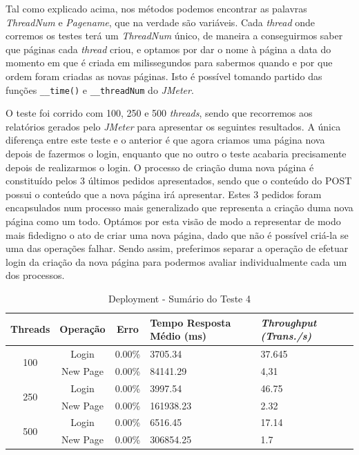 Tal como explicado acima, nos métodos podemos encontrar as palavras \textit{ThreadNum} e \textit{Pagename}, que na verdade são variáveis. Cada \textit{thread} onde corremos os testes terá um \textit{ThreadNum} único, de maneira a conseguirmos saber que páginas cada \textit{thread} criou, e optamos por dar o nome à página a data do momento em que é criada em milissegundos para sabermos quando e por que ordem foram criadas as novas páginas. Isto é possível tomando partido das funções \texttt{\_\_time()} e \texttt{\_\_threadNum} do \textit{JMeter}.

O teste foi corrido com 100, 250 e 500 \textit{threads}, sendo que recorremos aos relatórios gerados pelo \textit{JMeter} para apresentar os seguintes resultados. A única diferença entre este teste e o anterior é que agora criamos uma página nova depois de fazermos o login, enquanto que no outro o teste acabaria precisamente depois de realizarmos o login. O processo de criação duma nova página é constituído pelos 3 últimos pedidos apresentados, sendo que o conteúdo do POST possui o conteúdo que a nova página irá apresentar. Estes 3 pedidos foram encapsulados num processo mais generalizado que representa a criação duma nova página como um todo. Optámos por esta visão de modo a representar de modo mais fidedigno o ato de criar uma nova página, dado que não é possível criá-la se uma das operações falhar. Sendo assim, preferimos separar a operação de efetuar login da criação da nova página para podermos avaliar individualmente cada um dos processos. 

\begin{table}[H]
\centering
\begin{tabular}{|c|c|c|p{3.5cm}|p{3cm}|}
\hline
Threads              & Operação & Erro    & Tempo Resposta Médio (ms) & \textit{Throughput (Trans./s)} \\ \hline
\multirow{2}{*}{100} & Login    & 0.00\%  & 3705.34                   & 37.645                          \\
                     & New Page & 0.00\% & 84141.29                 & 4,31                           \\ \hline
\multirow{2}{*}{250} & Login    & 0.00\%  & 3997.54                  & 46.75                          \\
                     & New Page & 0.00\% & 161938.23                 & 2.32                           \\ \hline
\multirow{2}{*}{500} & Login    & 0.00\%  & 6516.45                  & 17.14                         \\
                     & New Page & 0.00\% & 306854.25                 & 1.7                          \\ \hline
\end{tabular}
\caption{Deployment - Sumário do Teste 4}
\end{table}

